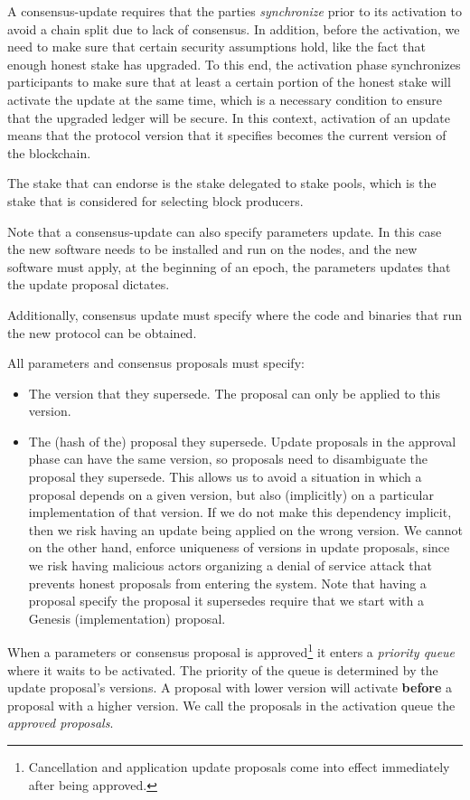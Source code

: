 A consensus-update requires that the parties \emph{synchronize} prior to its
activation to avoid a chain split due to lack of consensus. In addition, before
the activation, we need to make sure that certain security assumptions hold,
like the fact that enough honest stake has upgraded.
%
To this end, the activation phase synchronizes participants to make sure that at
least a certain portion of the honest stake will activate the update at the same
time, which is a necessary condition to ensure that the upgraded ledger will be
secure.
%
In this context, activation of an update means that the protocol version that it
specifies becomes the current version of the blockchain.

The stake that can endorse is the stake delegated to stake pools, which is the
stake that is considered for selecting block producers.

Note that a consensus-update can also specify parameters update. In this case
the new software needs to be installed and run on the nodes, and the new
software must apply, at the beginning of an epoch, the parameters updates that
the update proposal dictates.

Additionally, consensus update must specify where the code and binaries that
run the new protocol can be obtained.

All parameters and consensus proposals must specify:
\begin{itemize}
\item The version that they supersede. The proposal can only be applied to this
  version.
\item The (hash of the) proposal they supersede. Update proposals in the
  approval phase can have the same version, so proposals need to disambiguate
  the proposal they supersede. This allows us to avoid a situation in which a
  proposal depends on a given version, but also (implicitly) on a particular
  implementation of that version. If we do not make this dependency implicit,
  then we risk having an update being applied on the wrong version.
  We cannot on the other hand, enforce uniqueness of versions in update
  proposals, since we risk having malicious actors organizing a denial of
  service attack that prevents honest proposals from entering the system.
  Note that having a proposal specify the proposal it supersedes require that we
  start with a Genesis (implementation) proposal.
\end{itemize}

When a parameters or consensus proposal is approved\footnote{Cancellation and
  application update proposals come into effect immediately after being
  approved.} it enters a \emph{priority queue} where it waits to be activated.
The priority of the queue is determined by the update proposal's versions. A
proposal with lower version will activate \textbf{before} a 
proposal with a
higher version.
%
We call the proposals in the activation queue the \emph{approved proposals}.

